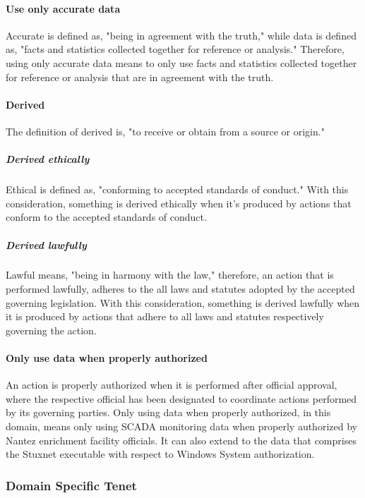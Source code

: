 \documentclass[12pt]{article}
\begin{document}
\begin{multicols}{2}
\paragraph{Use only accurate data}
Accurate is defined as, "being in agreement with the truth," while data is defined as, "facts and statistics collected together for reference or analysis."\cite{cambridgeDictionary} Therefore, using only accurate data means to only use facts and statistics collected together for reference or analysis that are in agreement with the truth.

\paragraph{Derived}
The definition of derived is, "to receive or obtain from a source or origin."\cite{softwareDefinition}

\subparagraph{Derived ethically}
Ethical is defined as, "conforming to accepted standards of conduct."\cite{cambridgeDictionary} With this consideration, something is derived ethically when it's produced by actions that conform to the accepted standards of conduct.

\subparagraph{Derived lawfully}
Lawful means, "being in harmony with the law," therefore, an action that is performed lawfully, adheres to the all laws and statutes adopted by the accepted governing legislation.\cite{cambridgeDictionary} With this consideration, something is derived lawfully when it is produced by actions that adhere to all laws and statutes respectively governing the action.

\paragraph{Only use data when properly authorized}
An action is properly authorized when it is performed after official approval, where the respective official has been designated to coordinate actions performed by its governing parties. Only using data when properly authorized, in this domain, means only using SCADA monitoring data when properly authorized by Nantez enrichment facility officials. It can also extend to the data that comprises the Stuxnet executable with respect to Windows System authorization.

\subsubsection{Domain Specific Tenet}


\end{multicols}
\end{document}
